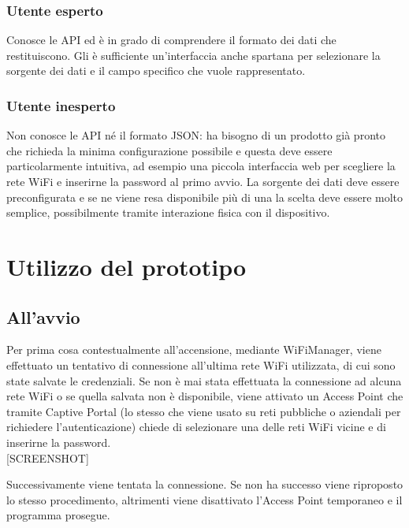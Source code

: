 \documentclass[12pt,a4paper]{report}
\begin{document}
\subsection*{Utente esperto}
Conosce le API ed è in grado di comprendere il formato dei dati che restituiscono. Gli è sufficiente un'interfaccia anche spartana
per selezionare la sorgente dei dati e il campo specifico che vuole rappresentato.
\subsection*{Utente inesperto}
Non conosce le API né il formato JSON: ha bisogno di un prodotto già pronto che richieda la minima configurazione possibile e questa
deve essere particolarmente intuitiva, ad esempio una piccola interfaccia web per scegliere la rete WiFi e inserirne la password
al primo avvio. La sorgente dei dati deve essere preconfigurata e se ne viene resa disponibile più di una la scelta deve essere molto
semplice, possibilmente tramite interazione fisica con il dispositivo.



\chapter{Utilizzo del prototipo}

\section{All'avvio}
Per prima cosa contestualmente all'accensione, mediante WiFiManager, viene effettuato un tentativo di connessione all'ultima rete WiFi
utilizzata, di cui sono state salvate le credenziali. Se non è mai stata effettuata la connessione ad alcuna rete WiFi o se
quella salvata non è disponibile, viene attivato un Access Point che tramite Captive Portal (lo stesso che viene usato su reti pubbliche
o aziendali per richiedere l'autenticazione) chiede di selezionare una delle reti WiFi vicine e di inserirne la password.\\

\vspace{4mm}
{[SCREENSHOT]}\\
\vspace{4mm}

Successivamente viene tentata la connessione. Se non ha successo viene riproposto lo stesso procedimento, altrimenti viene disattivato
l'Access Point temporaneo e il programma prosegue.
\end{document}
